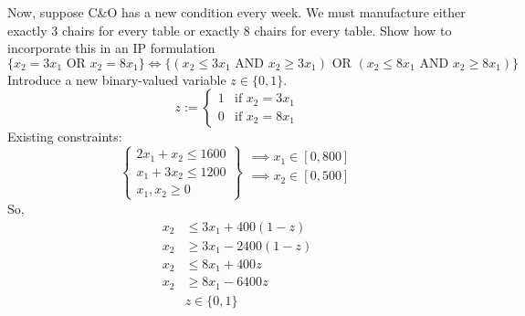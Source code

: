 \begin{exbox}
    \begin{example}
        Now, suppose C\&O has a new condition every week. We must manufacture either
        exactly 3 chairs for every table or exactly 8 chairs for every table. Show
        how to incorporate this in an IP formulation
        \[
            \{x_2=3x_1 \text{ OR } x_2=8x_1\}
            \iff
            \{(x_2\leqslant 3x_1 \text{ AND } x_2\geqslant 3x_1) \text{ OR }
            (x_2\leqslant 8x_1 \text{ AND } x_2\geqslant 8x_1)\}
        \]
        Introduce a new binary-valued variable $z\in\{0,1\}$.
        \[
            z:=
            \begin{cases}
                1 & \text{if } x_2=3x_1 \\
                0 & \text{if } x_2=8x_1
            \end{cases}
        \]
        Existing constraints:
        \[
            \left\{\begin{array}{r}
                2x_1 + x_2 \leqslant 1600 \\
                x_1 + 3x_2 \leqslant 1200 \\
                x_1, x_2 \geqslant  0
            \end{array}\right\}
            \begin{array}{r}
                \implies x_1\in[0,800] \\
                \implies x_2\in[0,500] \\
                \\
            \end{array}
        \]
        So,
        \begin{align*}
            x_2 & \leqslant 3x_1+400(1-z)   \\
            x_2 & \geqslant  3x_1-2400(1-z) \\
            x_2 & \leqslant 8x_1+400z       \\
            x_2 & \geqslant  8x_1-6400z     \\
                & z\in\{0,1\}
        \end{align*}
    \end{example}
\end{exbox}
